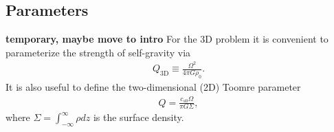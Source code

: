 \subsection{Parameters}
{\bf temporary, maybe move to intro}
For the 3D problem it is convenient to parameterize the strength of
self-gravity via 
\begin{align}
  Q_\mathrm{3D} \equiv \frac{\Omega^2}{4\pi G \rho_0}. 
\end{align}
It is also useful to define the
two-dimensional (2D) Toomre parameter 
\begin{align}
  Q = \frac{c_{s0}\Omega}{\pi G \Sigma}, 
\end{align}
where $\Sigma = \int_{-\infty}^\infty\rho dz$ is the surface density. 




